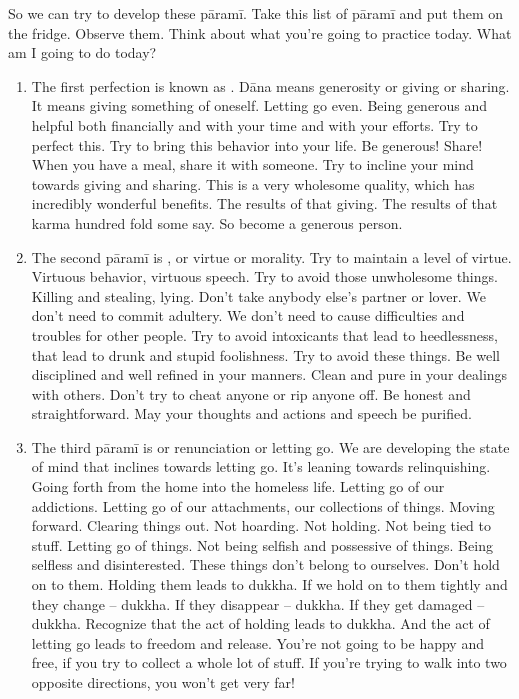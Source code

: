 \documentclass[letterpaper,10pt,english]{sphinxmanual}
\begin{document}
\sphinxAtStartPar
So we can try to develop these pāramī. Take this list of pāramī and put
them on the fridge. Observe them. Think about what you’re going to practice
today. What am I going to do today?
\begin{enumerate}
%
\item {} 
\sphinxAtStartPar
The  first  perfection  is  known  as
.  Dāna  means  generosity  or
giving  or  sharing.  It  means  giving  something  of  oneself.  Letting  go
even. Being generous and helpful both financially and with your time
and with your efforts. Try to perfect this. Try to bring this behavior into
your  life.  Be  generous!  Share! When  you  have  a  meal,  share  it  with
someone. Try to incline your mind towards giving and sharing. This
is a very wholesome quality, which has incredibly wonderful benefits.
The results of that giving. The results of that karma hundred fold some
say. So become a generous person.

\item {} 
\sphinxAtStartPar
The second pāramī is
, or virtue or morality. Try to maintain a
level of virtue. Virtuous behavior, virtuous speech. Try to avoid those
unwholesome things. Killing and stealing, lying. Don’t take anybody
else’s partner or lover. We don’t need to commit adultery. We don’t need
to cause difficulties and troubles for other people. Try to avoid intoxicants that lead to heedlessness, that lead to drunk and stupid foolishness. Try to avoid these things. Be well disciplined and well refined in
your manners. Clean and pure in your dealings with others. Don’t try
to cheat anyone or rip anyone off. Be honest and straightforward. May
your thoughts and actions and speech be purified.

\item {} 
\sphinxAtStartPar
The third pāramī is
or renunciation or letting go. We are
developing the state of mind that inclines towards letting go. It’s leaning towards relinquishing. Going forth from the home into the homeless life. Letting go of our addictions. Letting go of our attachments,
our  collections  of  things.  Moving  forward.  Clearing  things  out.  Not
hoarding. Not holding. Not being tied to stuff. Letting go of things. Not
being selfish and possessive of things. Being selfless and disinterested.
These things don’t belong to ourselves. Don’t hold on to them. Holding
them leads to dukkha. If we hold on to them tightly and they change
– dukkha. If they disappear – dukkha. If they get damaged – dukkha.
Recognize that the act of holding leads to dukkha. And the act of letting go leads to freedom and release. You’re not going to be happy and
free, if you try to collect a whole lot of stuff. If you’re trying to walk
into two opposite directions, you won’t get very far!


\end{enumerate}
\end{document}
